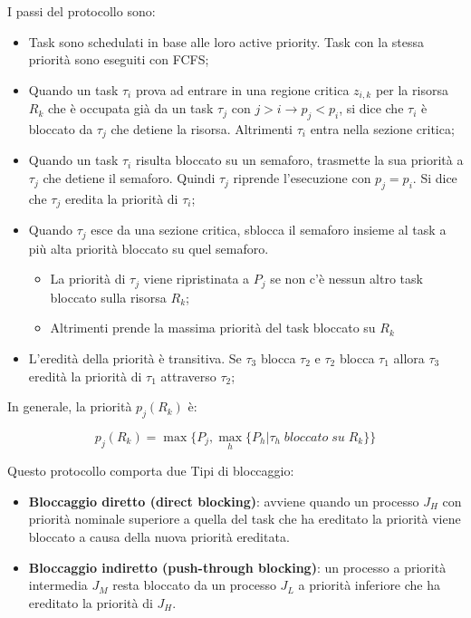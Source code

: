 \documentclass[11pt,a4paper]{report}
\begin{document}
I passi del protocollo sono:
\begin{itemize}
    \item Task sono schedulati in base alle loro active priority. Task con la stessa priorità sono eseguiti con FCFS;
    \item Quando un task $\tau_i$ prova ad entrare in una regione critica $z_{i,k}$ per la risorsa $R_k$ che è occupata già da un task $\tau_j$ con $j > i \to p_j < p_i$, si dice che $\tau_i$ è bloccato da $\tau_j$ che detiene la risorsa. Altrimenti $\tau_i$ entra nella sezione critica;
    \item Quando un task $\tau_i$ risulta bloccato su un semaforo, trasmette la sua priorità a $\tau_j$ che detiene il semaforo. Quindi $\tau_j$ riprende l'esecuzione con $p_j = p_i$. Si dice che $\tau_j$ eredita la priorità di $\tau_i$;
    \item Quando $\tau_j$ esce da una sezione critica, sblocca il semaforo insieme al task a più alta priorità bloccato su quel semaforo.
        \begin{itemize}
            \item La priorità di $\tau_j$ viene ripristinata a $P_j$ se non c'è nessun altro task bloccato sulla risorsa $R_k$;
            \item Altrimenti prende la massima priorità del task bloccato su $R_k$
        \end{itemize}
    \item L'eredità della priorità è transitiva. Se $\tau_3$ blocca $\tau_2$ e $\tau_2$ blocca $\tau_1$ allora $\tau_3$ eredità la priorità di $\tau_1$ attraverso $\tau_2$;
\end{itemize}

In generale, la priorità $p_j(R_k)$ è:

\[ p_j(R_k) = \max\{P_j, \max_h\{P_h | \tau_h\; bloccato\; su\; R_k\}\}\]

Questo protocollo comporta due Tipi di bloccaggio:
\begin{itemize}
    \item \textbf{Bloccaggio diretto (direct blocking)}: avviene quando un processo $J_H$ con priorità nominale superiore a quella del task che ha ereditato la priorità viene bloccato a causa della nuova priorità ereditata.
    \item \textbf{Bloccaggio indiretto (push-through blocking)}: un processo a priorità intermedia $J_M$ resta bloccato da un processo $J_L$ a priorità inferiore che ha ereditato la priorità di $J_H$.
\end{itemize}
\end{document}
